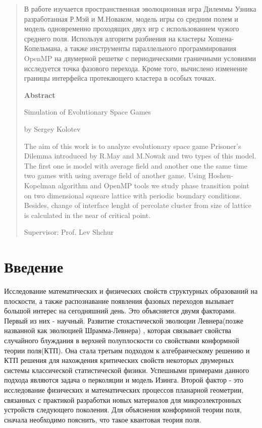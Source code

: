 \documentclass[a4paper]{article}
\begin{document}
	\begin{abstract}
		В работе изучается пространственная эволюционная игра Дилеммы Узника разработанная Р.Мэй и М.Новаком, модель игры со средним полем и модель одновременно проходящих двух игр с использованием чужого среднего поля. Используя алгоритм разбиения на кластеры Хошена-Копельмана, а также инструменты параллельного программирования OpenMP на двумерной решетке с периодическими граничными условиями исследуется точка фазового перехода. Кроме того, вычислено изменение границы интерфейса протекающего кластера в особых точках.
		
		\vspace{2cm}
		
		\begin{center}
			\textbf{Abstract}
			
			Simulation of Evolutionary Space Games
			
			by Sergey Kolotev
		\end{center}

		The aim of this work is to analyze evolutionary space game Prisoner's Dilemma introduced by R.May and M.Nowak and two types of this model. The first one is model with average field and another one the same time two games with using average field of another game. Using Hoshen-Kopelman algorithm and OpenMP tools we study phase transition point on two dimensional squeare lattice with periodic boundary conditions. Besides, change of interface lenght of percolate cluster from size of lattice is calculated in the near of critical point. 
		
		
		Supervisor: Prof. Lev Shchur 
				
	\end{abstract}
		
	\newpage
	
	
	\tableofcontents
	
	\newpage
	
	\section{Введение}
	
	\par Исследование математических и физических свойств структурных образований на плоскости, а также распознавание появления фазовых переходов вызывает большой интерес на сегодняшний день. Это объясняется двумя факторами. Первый из них - научный. Развитие стохастической эволюции Левнера(позже названной как эволюцией Шрамма-Левнера) \cite{shram}, которая связывает свойства случайного блуждания в верхней полуплоскости со свойствами конформной теории поля(КТП)\cite{cft}. Она стала третьим подходом к алгебраическому решению\cite{stat_model} и КТП\cite{conf_algeb} решения для нахождения критических свойств некоторых двумерных системы классической статистической физики. Успешными примерами данного подхода являются задача о перколяции\cite{harm_expl,crit_perc} и модель Изинга\cite{conf_inv}. Второй фактор - это исследование физических и математических процессов планарной геометрии, связанных с практикой разработки новых материалов для микроэлектронных устройств следующего поколения\cite{microvawe}. Для объяснения конформной теории поля, сначала необходимо пояснить, что такое квантовая теория поля. 
	
\end{document}
